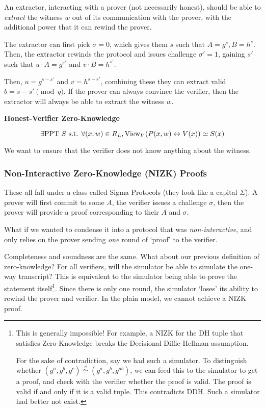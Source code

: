 An extractor, interacting with a prover (not necessarily honest), should be able to \emph{extract} the witness $w$ out of its communication with the prover, with the additional power that it can rewind the prover.


The extractor can first pick $\sigma = 0$, which gives them $s$ such that $A = g^s, B = h^s$. Then, the extractor rewinds the protocol and issues challenge $\sigma' = 1$, gaining $s'$ such that $u\cdot A = g^{s'}$ and $v\cdot B = h^{s'}$.

Then, $u = g^{s-s'}$ and $v = h^{s-s'}$, combining these they can extract valid $b = s-s'\pmod{q}$. If the prover can always convince the verifier, then the extractor will always be able to extract the witness $w$.

\textbf{Honest-Verifier Zero-Knowledge}

\[\exists\mathrm{PPT}\ S\text{ s.t. }\forall(x, w)\in R_L, \mathrm{View}_V(P(x, w)\leftrightarrow V(x))\simeq S(x)\]

We want to ensure that the verifier does not know anything about the witness. 

\subsubsection{Non-Interactive Zero-Knowledge (NIZK) Proofs}
These all fall under a class called Sigma Protocols (they look like a capital $\Sigma$). A prover will first commit to some $A$, the verifier issues a challenge $\sigma$, then the prover will provide a proof corresponding to their $A$ and $\sigma$.

What if we wanted to condense it into a protocol that was \emph{non-interactive}, and only relies on the prover sending \emph{one} round of `proof' to the verifier.


Completeness and soundness are the same. What about our previous definition of zero-knowledge? For all verifiers, will the simulator be able to simulate the one-way transcript? This is equivalent to the simulator being able to prove the statement itself\footnote{This is generally impossible! For example, a NIZK for the DH tuple that satisfies Zero-Knowledge breaks the Decisional Diffie-Hellman assumption.

    For the sake of contradiction, say we had such a simulator. To distinguish whether $(g^a, g^b, g^c)\overset{c}{\simeq}(g^a, g^b, g^{ab})$, we can feed this to the simulator to get a proof, and check with the verifier whether the proof is valid. The proof is valid if and only if it is a valid tuple. This contradicts DDH. Such a simulator had better not exist. }. Since there is only one round, the simulator `loses' its ability to rewind the prover and verifier. In the plain model, we cannot achieve a NIZK proof.

